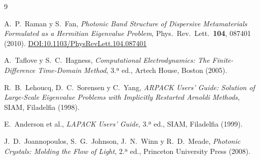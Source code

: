 \documentclass[12pt,a4paper]{article}
\begin{document}
\begin{thebibliography}{9}

A.~P.~Raman y S.~Fan,
\textit{Photonic Band Structure of Dispersive Metamaterials Formulated as
a Hermitian Eigenvalue Problem},
Phys.\ Rev.\ Lett.\ \textbf{104}, 087401 (2010).
\href{https://doi.org/10.1103/PhysRevLett.104.087401}{DOI:10.1103/PhysRevLett.104.087401}

A.~Taflove y S.~C.~Hagness,
\textit{Computational Electrodynamics: The Finite-Difference Time-Domain Method},
3.ª ed., Artech House, Boston (2005).

R.~B.~Lehoucq, D.~C.~Sorensen y C.~Yang,
\textit{ARPACK Users' Guide: Solution of Large-Scale Eigenvalue Problems
with Implicitly Restarted Arnoldi Methods},
SIAM, Filadelfia (1998).

E.~Anderson et al.,
\textit{LAPACK Users' Guide},
3.ª ed., SIAM, Filadelfia (1999).

J.~D.~Joannopoulos, S.~G.~Johnson, J.~N.~Winn y R.~D.~Meade,
\textit{Photonic Crystals: Molding the Flow of Light},
2.ª ed., Princeton University Press (2008).

\end{thebibliography}
\end{document}
